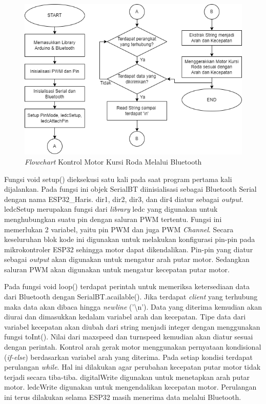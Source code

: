 \begin{figure} [ht] \centering
  \includegraphics[scale=0.7]{gambar/program/7. Kontrol Motor Bluetooth.png}
  \caption{\emph{Flowchart} Kontrol Motor Kursi Roda Melalui Bluetooth}
  \label{fig:Flowchart 7 Kontrol Bluetooth}
\end{figure}

Fungsi void setup() dieksekusi satu kali pada saat program pertama kali dijalankan. Pada fungsi ini objek SerialBT diinisialisasi sebagai Bluetooth Serial dengan nama ESP32\_Haris. dir1, dir2, dir3, dan dir4 diatur sebagai \emph{output}. ledcSetup merupakan fungsi dari \emph{library} ledc yang digunakan untuk menghubungkan suatu pin dengan saluran PWM tertentu. Fungsi ini memerlukan 2 variabel, yaitu pin PWM dan juga PWM \emph{Channel}. Secara keseluruhan blok kode ini digunakan untuk melakukan konfigurasi pin-pin pada mikrokontroler ESP32 sehingga motor dapat dikendalikan. Pin-pin yang diatur sebagai \emph{output} akan digunakan untuk mengatur arah putar motor. Sedangkan saluran PWM akan digunakan untuk mengatur kecepatan putar motor.

Pada fungsi void loop() terdapat perintah untuk memeriksa ketersediaan data dari Bluetooth dengan SerialBT.acailable(). Jika terdapat \emph{client} yang terhubung maka data akan dibaca hingga \emph{newline} ('\textbackslash n'). Data yang diterima kemudian akan diurai dan dimasukkan kedalam variabel arah dan kecepatan. Tipe data dari variabel kecepatan akan diubah dari string menjadi integer dengan menggunakan fungsi toInt(). Nilai dari maxspeed dan turnspeed kemudian akan diatur sesuai dengan perintah. Kontrol arah gerak motor menggunakan pernyataan kondisional (\emph{if-else}) berdasarkan variabel arah yang diterima. Pada setiap kondisi terdapat perulangan \emph{while}. Hal ini dilakukan agar perubahan kecepatan putar motor tidak terjadi secara tiba-tiba. digitalWrite digunakan untuk menetapkan arah putar motor. ledcWrite digunakan untuk mengendalikan kecepatan motor. Perulangan ini terus dilakukan selama ESP32 masih menerima data melalui Bluetooth.

